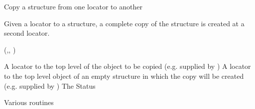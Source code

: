 \begin{manroutinedescription}
     Copy a {} structure from one locator to another

     Given a locator to a {} structure, a complete copy of the %
structure
     is created at a second locator.

     {}

     {} {} ({},{},{%
})

\begin{manparametertable}
 A locator %
to the
                       top level of the object to
                       be copied (e.g. supplied by {})
 A locator %
to the top level
                       object of an empty structure in which the
                       copy will be created (e.g. supplied by {})
 The Status

\end{manparametertable}
     Various {} routines
\end{manroutinedescription}
